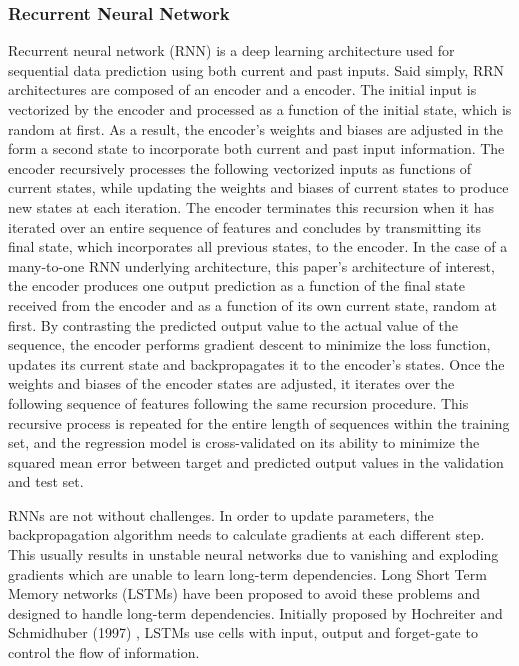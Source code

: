 \documentclass[11pt]{article}
\begin{document}
\subsubsection{Recurrent Neural Network}
Recurrent neural network (RNN) is a deep learning architecture used for sequential data prediction using both current and past inputs.  
Said simply, RRN architectures are composed of an encoder and a encoder. The initial input is vectorized by the encoder and processed as a function of the initial state, which is random at first. As a result, the encoder's weights and biases are adjusted in the form a second state to incorporate both current and past input information. The encoder recursively processes the following vectorized inputs as functions of current states, while updating the weights and biases of current states to produce new states at each iteration. The encoder terminates this recursion when it has iterated over an entire sequence of features and concludes by transmitting its final state, which incorporates all previous states, to the encoder. In the case of a many-to-one RNN underlying architecture, this paper's architecture of interest, the encoder produces one output prediction as a function of the final state received from the encoder and as a function of its own current state, random at first. By contrasting the predicted output value to the actual value of the sequence, the encoder performs gradient descent to minimize the loss function, updates its current state and backpropagates it to the encoder's states. Once the weights and biases of the encoder states are adjusted, it iterates over the following sequence of features following the same recursion procedure. This recursive process is repeated for the entire length of sequences within the training set, and the regression model is cross-validated on its ability to minimize the squared mean error between target and predicted output values in the validation and test set. 


RNNs are not without challenges. In order to update parameters, the backpropagation algorithm needs to calculate gradients at each different step. This usually results in unstable neural networks due to vanishing and exploding gradients which are unable to learn long-term dependencies. Long Short Term Memory networks (LSTMs) have been proposed to avoid these problems and designed to handle long-term dependencies. Initially proposed by Hochreiter and Schmidhuber (1997) \cite{hochreiter1997long},  LSTMs use cells with input, output and forget-gate to control the flow of information. 
\end{document}
